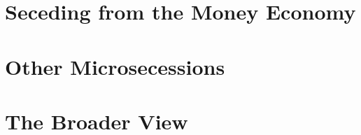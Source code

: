 \documentclass[twoside]{book}
\begin{document}
\sloppy

\frontmatter



\tableofcontents

\newpage 

\listofpolicy


\mainmatter




\part{Seceding from the Money Economy}





\part{Other Microsecessions}






\part{The Broader View}






\end{document}
